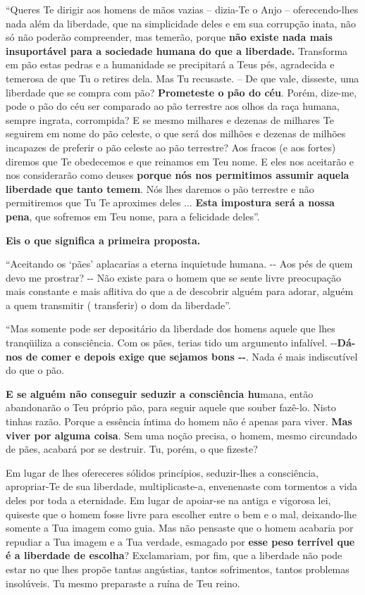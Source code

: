 ``Queres Te dirigir aos homens de mãos vazias -- dizia-Te o Anjo --
oferecendo-lhes nada além da liberdade, que na simplicidade deles e em
sua corrupção inata, não só não poderão compreender, mas temerão, porque
\textbf{não existe nada mais insuportável para a sociedade humana do que
a liberdade.} Transforma em pão estas pedras e a humanidade se
precipitará a Teus pés, agradecida e temerosa de que Tu o retires dela.
Mas Tu recusaste. -- De que vale, disseste, uma liberdade que se compra
com pão? \textbf{Prometeste o pão do céu}. Porém, dize-me, pode o pão do
céu ser comparado ao pão terrestre aos olhos da raça humana, sempre
ingrata, corrompida? E se mesmo milhares e dezenas de milhares Te
seguirem em nome do pão celeste, o que será dos milhões e dezenas de
milhões incapazes de preferir o pão celeste ao pão terrestre? Aos fracos
(e aos fortes) diremos que Te obedecemos e que reinamos em Teu nome. E
eles nos aceitarão e nos considerarão como deuses \textbf{porque nós nos
permitimos assumir aquela liberdade que tanto temem}. Nós lhes daremos o
pão terrestre e não permitiremos que Tu Te aproximes deles ...
\textbf{Esta impostura será a nossa pena}, que sofremos em Teu nome,
para a felicidade deles''.

\textbf{Eis o que significa a primeira proposta.}

``Aceitando os `pães' aplacarias a eterna inquietude humana. -\/- Aos
pés de quem devo me prostrar? -\/- Não existe para o homem que se sente
livre preocupação mais constante e mais aflitiva do que a de descobrir
alguém para adorar, alguém a quem transmitir ( transferir) o dom da
liberdade''.

``Mas somente pode ser depositário da liberdade dos homens aquele que
lhes tranqüiliza a consciência. Com os pães, terias tido um argumento
infalível. -\/-\textbf{Dá-nos de comer e depois exige que sejamos bons
-\/-}. Nada é mais indiscutível do que o pão.

\textbf{E se alguém não conseguir seduzir a consciência hu}mana, então
abandonarão o Teu próprio pão, para seguir aquele que souber fazê-lo.
Nisto tinhas razão. Porque a essência íntima do homem não é apenas para
viver. \textbf{Mas viver por alguma coisa}. Sem uma noção precisa, o
homem, mesmo circundado de pães, acabará por se destruir. Tu, porém, o
que fizeste?

Em lugar de lhes ofereceres sólidos princípios, seduzir-lhes a
consciência, apropriar-Te de sua liberdade, multiplicaste-a, envenenaste
com tormentos a vida deles por toda a eternidade. Em lugar de apoiar-se
na antiga e vigorosa lei, quiseste que o homem fosse livre para escolher
entre o bem e o mal, deixando-lhe somente a Tua imagem como guia. Mas
não pensaste que o homem acabaria por repudiar a Tua imagem e a Tua
verdade, esmagado por \textbf{esse peso terrível que é a liberdade de
escolha}? Exclamariam, por fim, que a liberdade não pode estar no que
lhes propõe tantas angústias, tantos sofrimentos, tantos problemas
insolúveis. Tu mesmo preparaste a ruína de Teu reino.

